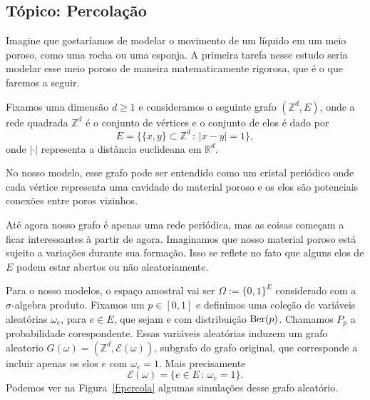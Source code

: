 \begin{topics}

\section{Tópico: Percolação}
\label{s:percolacao}

Imagine que gostaríamos de modelar o movimento de um líquido em um meio poroso, como uma rocha ou uma esponja.
A primeira tarefa nesse estudo seria modelar esse meio poroso de maneira matematicamente rigorosa, que é o que faremos a seguir.

Fixamos uma dimensão $d \geq 1$ e consideramos o seguinte grafo $(\mathbb{Z}^d, E)$,
onde a rede quadrada $\mathbb{Z}^d$ é o conjunto de vértices e o conjunto de elos é dado por
\begin{equation*}
  E = \big\{ \{x, y\} \subset \mathbb{Z}^d \, : \,  |x - y| = 1 \},
\end{equation*}
onde $|\cdot|$ representa a distância euclideana em $\mathbb{R}^d$.

No nosso modelo, esse grafo pode ser entendido como um cristal periódico onde cada vértice representa uma cavidade do material poroso e os elos são potenciais conexões entre poros vizinhos.

Até agora nosso grafo é apenas uma rede periódica, mas as coisas começam a ficar interessantes à partir de agora.
Imaginamos que nosso material poroso está sujeito a variações durante sua formação.
Isso se reflete no fato que alguns elos de $E$ podem estar abertos ou não aleatoriamente.

Para o nosso modelos, o espaço amostral vai ser $\Omega:= \{0,1\}^E$ considerado com a $\sigma$-algebra produto.
Fixamos um $p \in [0,1]$ e definimos uma coleção de variáveis aleatórias $\omega_e$, para $e \in E$, que sejam \iid e com distribuição $\operatorname{Ber}(p)$.
Chamamos $P_p$ a probabilidade corespondente.
Essas variáveis aleatórias induzem um grafo aleatorio $G(\omega)=(\mathbb{Z}^d, \mathcal{E}(\omega))$, subgrafo do grafo original,
que corresponde a incluir apenas os elos $e$ com $\omega_e = 1$.
Mais precisamente
\begin{equation}
  \mathcal{E}(\omega) = \big\{ e \in E\, : \, \omega_e = 1 \big\}.
\end{equation}
Podemos ver na Figura~\ref{f:percola} algumas simulações desse grafo aleatório.


\end{topics}
